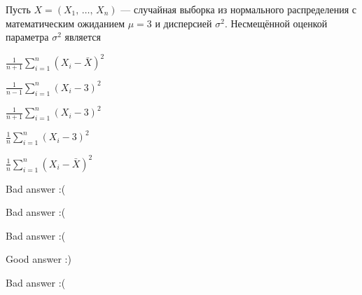 
\begin{question}
Пусть \(X = (X_1, \, \ldots, \, X_n)\) --- случайная выборка из
нормального распределения с математическим ожиданием \(\mu = 3\) и
дисперсией \(\sigma^2\). Несмещённой оценкой параметра \(\sigma^2\)
является
\begin{answerlist}
  \item \(\frac{1}{n+1} \sum_{i=1}^{n}(X_i - \bar{X})^2\)
  \item \(\frac{1}{n-1} \sum_{i=1}^{n}(X_i - 3)^2\)
  \item \(\frac{1}{n+1} \sum_{i=1}^{n}(X_i - 3)^2\)
  \item \(\frac{1}{n} \sum_{i=1}^{n}(X_i - 3)^2\)
  \item \(\frac{1}{n} \sum_{i=1}^{n}(X_i - \bar{X})^2\)
\end{answerlist}
\end{question}

\begin{solution}
\begin{answerlist}
  \item Bad answer :(
  \item Bad answer :(
  \item Bad answer :(
  \item Good answer :)
  \item Bad answer :(
\end{answerlist}
\end{solution}

